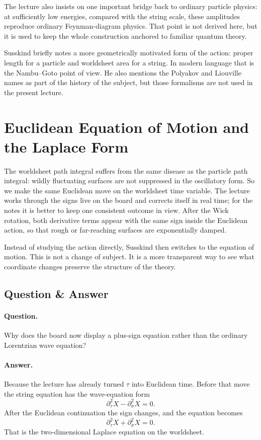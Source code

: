 The lecture also insists on one important bridge back to ordinary particle physics: at sufficiently low energies, compared with the string scale, these amplitudes reproduce ordinary Feynman-diagram physics. That point is not derived here, but it is used to keep the whole construction anchored to familiar quantum theory.

\begin{remark}
Susskind briefly notes a more geometrically motivated form of the action: proper length for a particle and worldsheet area for a string. In modern language that is the Nambu--Goto point of view. He also mentions the Polyakov and Liouville names as part of the history of the subject, but those formalisms are not used in the present lecture.
\end{remark}

\section{Euclidean Equation of Motion and the Laplace Form}

The worldsheet path integral suffers from the same disease as the particle path integral: wildly fluctuating surfaces are not suppressed in the oscillatory form. So we make the same Euclidean move on the worldsheet time variable. The lecture works through the signs live on the board and corrects itself in real time; for the notes it is better to keep one consistent outcome in view. After the Wick rotation, both derivative terms appear with the same sign inside the Euclidean action, so that rough or far-reaching surfaces are exponentially damped.

Instead of studying the action directly, Susskind then switches to the equation of motion. This is not a change of subject. It is a more transparent way to see what coordinate changes preserve the structure of the theory.

\subsection{Question \& Answer}

\paragraph{Question.} Why does the board now display a plus-sign equation rather than the ordinary Lorentzian wave equation?

\paragraph{Answer.} Because the lecture has already turned \(\tau\) into Euclidean time. Before that move the string equation has the wave-equation form
\begin{equation}
\partial_\tau^2 X-\partial_\sigma^2 X=0.
\end{equation}
After the Euclidean continuation the sign changes, and the equation becomes
\begin{equation}
\partial_\tau^2 X+\partial_\sigma^2 X=0.
\end{equation}
That is the two-dimensional Laplace equation on the worldsheet.

